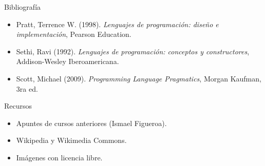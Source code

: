 \documentclass[handout]{beamer} %
\begin{document}

\begin{frame}
 \begin{block}{Bibliografía}
  \begin{itemize}
    \item Pratt, Terrence W. (1998). \textit{Lenguajes de programación: diseño e implementación}, Pearson Education.
    \item Sethi, Ravi (1992). \textit{Lenguajes de programación: conceptos y constructores}, Addison-Wesley Iberoamericana.
    \item Scott, Michael (2009). \textit{Programming Language Pragmatics}, Morgan Kaufman, 3ra ed.
  \end{itemize}
 \end{block}
 \begin{block}{Recursos}
  \begin{itemize}
    \item Apuntes de cursos anteriores (Ismael Figueroa).
    \item Wikipedia y Wikimedia Commons.
    \item Imágenes con licencia libre.
  \end{itemize}
 \end{block}
\end{frame}
\end{document}
